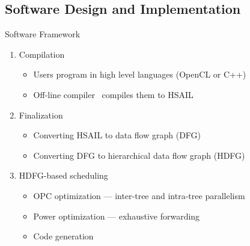 \documentclass{beamer}
\begin{document}
\begin{CJK}{UTF8}{bkai}
            \subsection{Software Design and Implementation}
            \begin{frame}{Software Framework}
                \begin{enumerate}
                    \item <2->{Compilation
                            \begin{itemize}
                                \item Users program in high level languages (OpenCL or C++)
                                \item Off-line compiler~ compiles them to HSAIL
                            \end{itemize}
                        }
                    \item <3->{Finalization
                            \begin{itemize}
                                \item Converting HSAIL to data flow graph (DFG)
                                \item Converting DFG to hierarchical data flow graph (HDFG)
                            \end{itemize}
                        }
                    \item <4->{HDFG-based scheduling
                            \begin{itemize}
                                \item OPC optimization --- inter-tree and intra-tree parallelism
                                \item Power optimization --- exhaustive forwarding
                                \item Code generation
                            \end{itemize}
                        }
                \end{enumerate}
            \end{frame}



\end{CJK}
\end{document}
